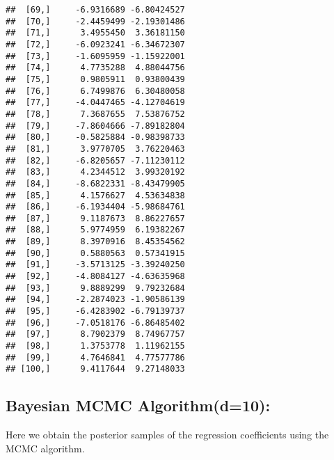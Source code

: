 \documentclass[
]{article}
\newenvironment{Shaded}{\begin{snugshade}}{\end{snugshade}}
\newcommand{\AttributeTok}[1]{\textcolor[rgb]{0.13,0.29,0.53}{#1}}
\newcommand{\CommentTok}[1]{\textcolor[rgb]{0.56,0.35,0.01}{\textit{#1}}}
\newcommand{\ConstantTok}[1]{\textcolor[rgb]{0.56,0.35,0.01}{#1}}
\newcommand{\DecValTok}[1]{\textcolor[rgb]{0.00,0.00,0.81}{#1}}
\newcommand{\FunctionTok}[1]{\textcolor[rgb]{0.13,0.29,0.53}{\textbf{#1}}}
\newcommand{\NormalTok}[1]{#1}
\newcommand{\OtherTok}[1]{\textcolor[rgb]{0.56,0.35,0.01}{#1}}
\newcommand{\SpecialCharTok}[1]{\textcolor[rgb]{0.81,0.36,0.00}{\textbf{#1}}}
\begin{document}
\begin{verbatim}
##  [69,]     -6.9316689 -6.80424527
##  [70,]     -2.4459499 -2.19301486
##  [71,]      3.4955450  3.36181150
##  [72,]     -6.0923241 -6.34672307
##  [73,]     -1.6095959 -1.15922001
##  [74,]      4.7735288  4.88044756
##  [75,]      0.9805911  0.93800439
##  [76,]      6.7499876  6.30480058
##  [77,]     -4.0447465 -4.12704619
##  [78,]      7.3687655  7.53876752
##  [79,]     -7.8604666 -7.89182804
##  [80,]     -0.5825884 -0.98398733
##  [81,]      3.9770705  3.76220463
##  [82,]     -6.8205657 -7.11230112
##  [83,]      4.2344512  3.99320192
##  [84,]     -8.6822331 -8.43479905
##  [85,]      4.1576627  4.53634838
##  [86,]     -6.1934404 -5.98684761
##  [87,]      9.1187673  8.86227657
##  [88,]      5.9774959  6.19382267
##  [89,]      8.3970916  8.45354562
##  [90,]      0.5880563  0.57341915
##  [91,]     -3.5713125 -3.39240250
##  [92,]     -4.8084127 -4.63635968
##  [93,]      9.8889299  9.79232684
##  [94,]     -2.2874023 -1.90586139
##  [95,]     -6.4283902 -6.79139737
##  [96,]     -7.0518176 -6.86485402
##  [97,]      8.7902379  8.74967757
##  [98,]      1.3753778  1.11962155
##  [99,]      4.7646841  4.77577786
## [100,]      9.4117644  9.27148033
\end{verbatim}

\hypertarget{bayesian-mcmc-algorithmd10}{%
\subsection{Bayesian MCMC
Algorithm(d=10):}\label{bayesian-mcmc-algorithmd10}}

Here we obtain the posterior samples of the regression coefficients
using the MCMC algorithm.

\begin{Shaded}
\end{Shaded}
\end{document}
